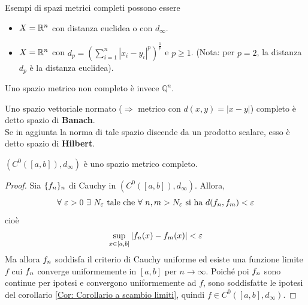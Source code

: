 \begin{example}
    Esempi di spazi metrici completi possono essere
    \begin{itemize}
        \item $X=\mathbb{R}^n$ con distanza euclidea o con $d_\infty$.
        \item $X=\mathbb{R}^n$ con $d_p= \left(\sum\limits_{i=1}^{n}{|x_i - y_i|^p}\right)^{\frac{1}{p}}$ e $p\geq 1$. (Nota: per $p=2$, la distanza $d_p$ è la distanza euclidea).
    \end{itemize}
    Uno spazio metrico non completo è invece $\mathbb{Q}^n$.
\end{example}
\begin{oss}
    Uno spazio vettoriale normato ($\Rightarrow$ metrico con $d(x, y)= |x-y|$) completo è detto spazio di \textbf{Banach}.\\
    Se in aggiunta la norma di tale spazio discende da un prodotto scalare, esso è detto spazio di \textbf{Hilbert}.
\end{oss}
\begin{theorem}
    $(C^0([a,b]), d_\infty)$ è uno spazio metrico completo.
\end{theorem}
\begin{proof}
    Sia $\{f_n\}_n$ di Cauchy in $(C^0([a,b]), d_\infty)$. Allora, 
    \begin{equation}
          \forall\ \varepsilon>0\ \exists\ N_\varepsilon\ \text{tale che}\ \forall\ n,m > N_\varepsilon\ \text{si ha}\ d(\fn, f_m)< \varepsilon
    \end{equation}
    cioè 
    \begin{equation}
     \sup\limits_{x \in [a,b]}{|f_n(x)-f_m(x)|}< \varepsilon
    \end{equation}
    Ma allora $f_n$ soddisfa il criterio di Cauchy uniforme ed esiste una funzione limite $f$ cui $f_n$ converge uniformemente in $[a,b]$ per $n \to \infty$. Poiché poi $f_n$ sono continue per ipotesi e convergono uniformemente ad $f$, sono soddisfatte le ipotesi del corollario \ref{Cor: Corollario a scambio limiti}, quindi $f \in C^0([a,b], d_\infty)$.
\end{proof}
